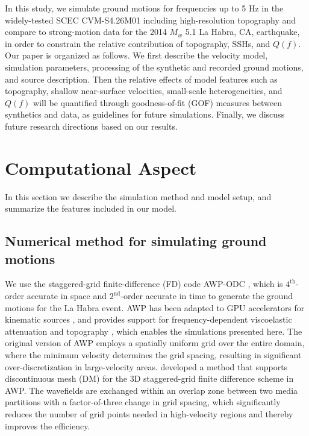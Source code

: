 In this study, we simulate ground motions for frequencies up to 5 Hz in the widely-tested SCEC CVM-S4.26M01 including high-resolution topography and compare to strong-motion data for the 2014 $M_w$ 5.1 La Habra, CA, earthquake, in order to constrain the relative contribution of topography, SSHs, and $Q(f)$. Our paper is organized as follows. We first describe the velocity model, simulation parameters, processing of the synthetic and recorded ground motions, and source description. Then the relative effects of model features such as topography, shallow near-surface velocities, small-scale heterogeneities, and $Q(f)$ will be quantified through goodness-of-fit (GOF) measures between synthetics and data, as guidelines for future simulations. Finally, we discuss future research directions based on our results.



\section{Computational Aspect}\label{approach}

In this section we describe the simulation method and model setup, and summarize the features included in our model.

\subsection{Numerical method for simulating ground motions}
We use the staggered-grid finite-difference (FD) code AWP-ODC \citep[Anelastic Wave Propagation, Olsen-Day-Cui, from the authors of the code, hereafter denoted by AWP;][]{cuiScalableEarthquakeSimulation2010}, which is $4^{\text{th}}$-order accurate in space and $2^{\text{nd}}$-order accurate in time to generate the ground motions for the La Habra event. AWP has been adapted to GPU accelerators for kinematic sources \citep{cui2013physics}, and provides support for frequency-dependent viscoelastic attenuation \citep{withersMemoryEfficientSimulation2015} and topography \citep{oreillyHighorderFiniteDifference2021}, which enables the simulations presented here. The original version of AWP employs a spatially uniform grid over the entire domain, where the minimum velocity determines the grid spacing, resulting in significant over-discretization in large-velocity areas. \citet{nieFourthOrderStaggered2017} developed a method that supports discontinuous mesh (DM) for the 3D staggered-grid finite difference scheme in AWP. The wavefields are exchanged within an overlap zone between two media partitions with a factor-of-three change in grid spacing, which significantly reduces the number of grid points needed in high-velocity regions and thereby improves the efficiency.


